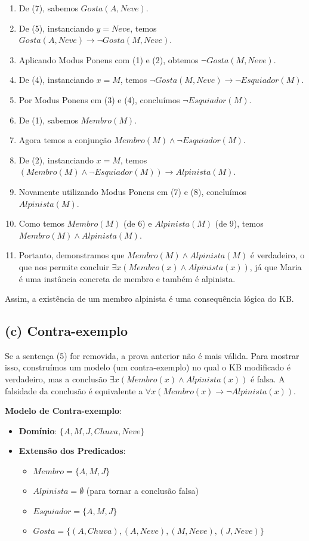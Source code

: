 \documentclass{article}
\begin{document}
\begin{enumerate}
    \item De (7), sabemos $Gosta(A, Neve)$.
    \item De (5), instanciando $y=Neve$, temos $Gosta(A, Neve) \rightarrow \neg Gosta(M, Neve)$.
    \item Aplicando Modus Ponens com (1) e (2), obtemos $\neg Gosta(M, Neve)$.
    \item De (4), instanciando $x=M$, temos $\neg Gosta(M, Neve) \rightarrow \neg Esquiador(M)$.
    \item Por Modus Ponens em (3) e (4), concluímos $\neg Esquiador(M)$.
    \item De (1), sabemos $Membro(M)$.
    \item Agora temos a conjunção $Membro(M) \wedge \neg Esquiador(M)$.
    \item De (2), instanciando $x=M$, temos $(Membro(M) \wedge \neg Esquiador(M)) \rightarrow Alpinista(M)$.
    \item Novamente utilizando Modus Ponens em (7) e (8), concluímos $Alpinista(M)$.
    \item Como temos $Membro(M)$ (de 6) e $Alpinista(M)$ (de 9), temos $Membro(M) \wedge Alpinista(M)$.
    \item Portanto, demonstramos que $Membro(M) \wedge Alpinista(M)$ é verdadeiro, o que nos permite concluir $\exists x (Membro(x) \wedge Alpinista(x))$, já que Maria é uma instância concreta de membro e também é alpinista.
\end{enumerate}
Assim, a existência de um membro alpinista é uma consequência lógica do KB.

\subsection*{(c) Contra-exemplo}
Se a sentença (5) for removida, a prova anterior não é mais válida. Para mostrar isso, construímos um modelo (um contra-exemplo) no qual o KB modificado é verdadeiro, mas a conclusão $\exists x (Membro(x) \wedge Alpinista(x))$ é falsa. A falsidade da conclusão é equivalente a $\forall x (Membro(x) \rightarrow \neg Alpinista(x))$.

\textbf{Modelo de Contra-exemplo}:
\begin{itemize}
    \item \textbf{Domínio}: $\{A, M, J, Chuva, Neve\}$
    \item \textbf{Extensão dos Predicados}:
    \begin{itemize}
        \item $Membro = \{A, M, J\}$
        \item $Alpinista = \emptyset$ (para tornar a conclusão falsa)
        \item $Esquiador = \{A, M, J\}$
        \item $Gosta = \{(A, Chuva), (A, Neve), (M, Neve), (J, Neve)\}$
    \end{itemize}
\end{itemize}
\end{document}
